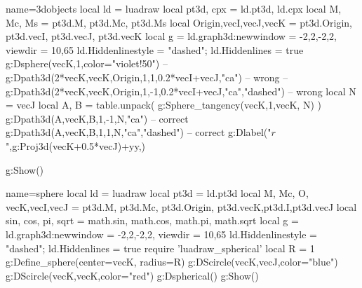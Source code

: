 \documentclass{standalone}
\begin{document}
\begin{luadraw}{name=3dobjects}
local ld = luadraw
local pt3d, cpx = ld.pt3d, ld.cpx
local M, Mc, Ms = pt3d.M, pt3d.Mc, pt3d.Ms
local Origin,vecI,vecJ,vecK = pt3d.Origin, pt3d.vecI, pt3d.vecJ, pt3d.vecK
local g = ld.graph3d:new{window = {-2,2,-2,2}, viewdir = {10,65}}
ld.Hiddenlinestyle = "dashed"; ld.Hiddenlines = true
g:Dsphere(vecK,1,{color="violet!50"})
--g:Dpath3d({2*vecK,vecK,Origin,1,1,0.2*vecI+vecJ,"ca"}) -- wrong
--g:Dpath3d({2*vecK,vecK,Origin,1,-1,0.2*vecI+vecJ,"ca"},"dashed") -- wrong
local N = vecJ
local A, B = table.unpack( g:Sphere_tangency(vecK,1,{vecK, N}) )
g:Dpath3d({A,vecK,B,1,-1,N,"ca"}) -- correct
g:Dpath3d({A,vecK,B,1,1,N,"ca"},"dashed") -- correct
g:Dlabel("$r$",g:Proj3d(vecK+0.5*vecJ)+yy,{})

g:Show()
\end{luadraw}

\begin{luadraw}{name=sphere}
local ld = luadraw
local pt3d = ld.pt3d
local M, Mc, O, vecK,vecI,vecJ = pt3d.M, pt3d.Mc, pt3d.Origin,  pt3d.vecK,pt3d.I,pt3d.vecJ
local sin, cos, pi, sqrt = math.sin, math.cos, math.pi, math.sqrt
local g = ld.graph3d:new{window = {-2,2,-2,2}, viewdir = {10,65}}
ld.Hiddenlinestyle = "dashed"; ld.Hiddenlines = true
require 'luadraw_spherical'
local R = 1
g:Define_sphere({center=vecK, radius=R}) 
g:DScircle({vecK,vecJ},{color="blue"})
g:DScircle({vecK,vecK},{color="red"})
g:Dspherical()
g:Show()
\end{luadraw} 
\end{document}
